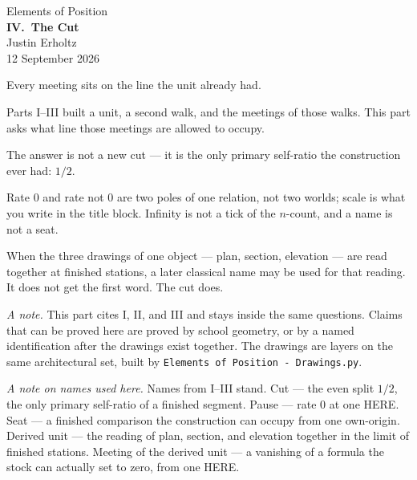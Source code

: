 \documentclass[10pt,a4paper]{article}
\theoremstyle{plain}
\theoremstyle{definition}
\theoremstyle{remark}
\begin{document}
\begin{center}
\vspace*{2.2em}
{\large Elements of Position}\\[1.6em]
{\LARGE\bfseries IV.\ The Cut}\\[2.2em]
{\normalsize Justin Erholtz}\\[0.35em]
{\small 12 September 2026}
\end{center}

\vspace{2.4em}

\begin{center}
{\large Every meeting sits on the line the unit already had.}
\end{center}

\vspace{1.8em}

\noindent
Parts I--III built a unit, a second walk, and the meetings of those walks.
This part asks what line those meetings are allowed to occupy.

The answer is not a new cut --- it is the only primary self-ratio the construction ever had: $1/2$.

Rate $0$ and rate not $0$ are two poles of one relation, not two worlds; scale is what you write in the title block.
Infinity is not a tick of the $n$-count, and a name is not a seat.

When the three drawings of one object --- plan, section, elevation --- are read together at finished stations, a later classical name may be used for that reading.
It does not get the first word.
The cut does.

\vspace{1.4em}

\noindent
\textit{A note.}
This part cites I, II, and III and stays inside the same questions.
Claims that can be proved here are proved by school geometry, or by a named identification after the drawings exist together.
The drawings are layers on the same architectural set, built by \texttt{Elements of Position - Drawings.py}.

\vspace{0.9em}
\noindent
\textit{A note on names used here.}
Names from I--III stand.
Cut --- the even split $1/2$, the only primary self-ratio of a finished segment.
Pause --- rate $0$ at one HERE.
Seat --- a finished comparison the construction can occupy from one own-origin.
Derived unit --- the reading of plan, section, and elevation together in the limit of finished stations.
Meeting of the derived unit --- a vanishing of a formula the stock can actually set to zero, from one HERE.
\end{document}
